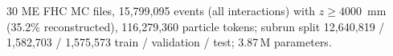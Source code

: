 30 ME FHC MC files, 15{,}799{,}095 events (all interactions) with $z \ge 4000$~mm (35.2\% reconstructed), 116{,}279{,}360 particle tokens; subrun split 12{,}640{,}819 / 1{,}582{,}703 / 1{,}575{,}573 train / validation / test; 3.87\,M parameters.
